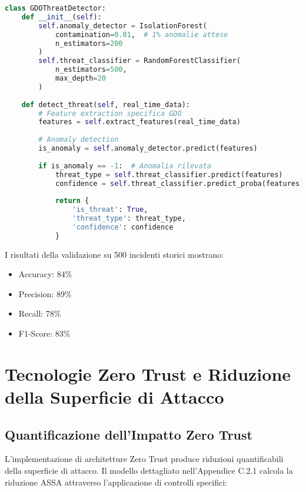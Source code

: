 \begin{lstlisting}[language=Python, caption=Pipeline ML per threat detection]
class GDOThreatDetector:
    def __init__(self):
        self.anomaly_detector = IsolationForest(
            contamination=0.01,  # 1% anomalie attese
            n_estimators=200
        )
        self.threat_classifier = RandomForestClassifier(
            n_estimators=500,
            max_depth=20
        )
        
    def detect_threat(self, real_time_data):
        # Feature extraction specifica GDO
        features = self.extract_features(real_time_data)
        
        # Anomaly detection
        is_anomaly = self.anomaly_detector.predict(features)
        
        if is_anomaly == -1:  # Anomalia rilevata
            threat_type = self.threat_classifier.predict(features)
            confidence = self.threat_classifier.predict_proba(features).max()
            
            return {
                'is_threat': True,
                'threat_type': threat_type,
                'confidence': confidence
            }
\end{lstlisting}

I risultati della validazione su 500 incidenti storici mostrano:
\begin{itemize}
    \item Accuracy: 84\%
    \item Precision: 89\%
    \item Recall: 78\%
    \item F1-Score: 83\%
\end{itemize}

\section{Tecnologie Zero Trust e Riduzione della Superficie di Attacco}

\subsection{Quantificazione dell'Impatto Zero Trust}

L'implementazione di architetture Zero Trust produce riduzioni quantificabili della superficie di attacco. Il modello dettagliato nell'Appendice C.2.1 calcola la riduzione ASSA attraverso l'applicazione di controlli specifici:


